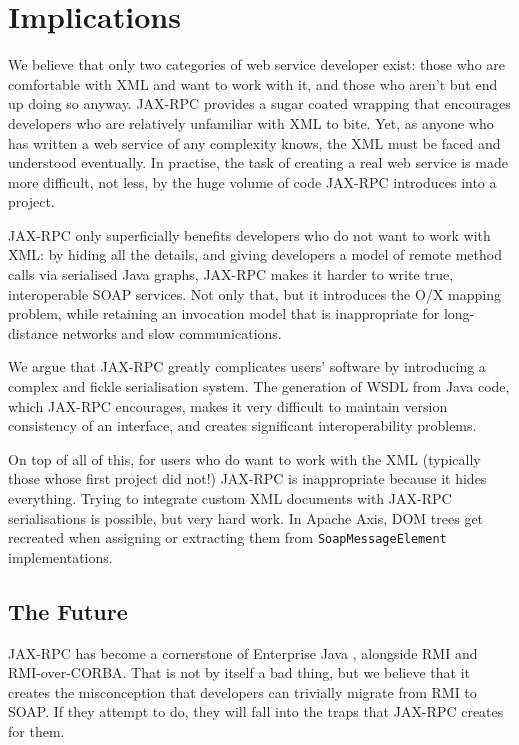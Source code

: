 \section{Implications}
\label{implications}

We believe that only two categories of web service developer exist:
those who are comfortable with XML and want to work with it, and those
who aren't but end up doing so anyway. JAX-RPC provides a sugar coated
wrapping that encourages developers who are relatively unfamiliar with
XML to bite. Yet, as anyone who has written a web service of any
complexity knows, the XML must be faced and understood eventually. In
practise, the task of creating a real web service is made more
difficult, not less, by the huge volume of code JAX-RPC introduces
into a project.

JAX-RPC only superficially benefits developers who do not want to work
with XML: by hiding all the details, and giving developers a model of
remote method calls via serialised Java graphs, JAX-RPC makes it
harder to write true, interoperable SOAP services. Not only that, but
it introduces the O/X mapping problem, while retaining an invocation
model that is inappropriate for long-distance networks and slow
communications.

We argue that JAX-RPC greatly complicates users' software by
introducing a complex and fickle serialisation system. The generation
of WSDL from Java code, which JAX-RPC encourages, makes it very
difficult to maintain version consistency of an interface, and
creates significant interoperability problems.

On top of all of this, for users who do want to work with the XML
(typically those whose first project did not!) JAX-RPC is
inappropriate because it hides everything. Trying to integrate custom
XML documents with JAX-RPC serialisations is possible, but very hard
work. In Apache Axis, DOM trees get recreated when assigning or
extracting them from {\tt SoapMessageElement} implementations.


\subsection{The Future}
\label{implications:future}

JAX-RPC has become a cornerstone of Enterprise Java
\cite{spec:J2EE-14}, alongside RMI and RMI-over-CORBA. That is not by
itself a bad thing, but we believe that it creates the misconception
that developers can trivially migrate from RMI to SOAP. If they
attempt to do, they will fall into the traps that JAX-RPC creates for
them.

